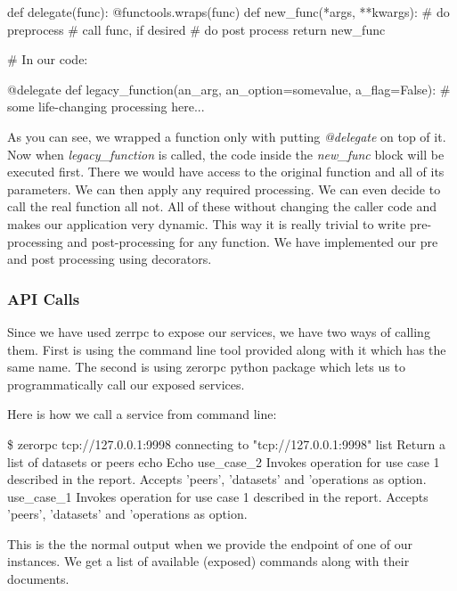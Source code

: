 \begin{python}
def delegate(func):
    @functools.wraps(func)
    def new_func(*args, **kwargs):
        # do preprocess
        # call func, if desired
        # do post process
    return new_func

# In our code:

@delegate
def legacy_function(an_arg, an_option=somevalue, a_flag=False):
    # some life-changing processing here...

\end{python}
As you can see, we wrapped a function only with putting \textit{@delegate} on top of it.
Now when \textit{legacy\_function} is called, the code inside the \textit{new\_func} block
will be executed first. 
There we would have access to the original function and all of its parameters. 
We can then apply any required processing. 
We can even decide to call the real function all not.
All of these without changing the caller code and makes our application very dynamic.
This way it is really trivial to write pre-processing and post-processing for any function.
We have implemented our pre and post processing using decorators.

\subsubsection{API Calls}
Since we have used zerrpc to expose our services, we have two ways of calling them.
First is using the command line tool provided along with it which has the same name.
The second is using zerorpc python package which lets us to programmatically call
our exposed services.

Here is how we call a service from command line:

\begin{python}
\$ zerorpc tcp://127.0.0.1:9998
connecting to "tcp://127.0.0.1:9998"
list             Return a list of datasets or peers
echo             Echo
use_case_2       Invokes operation for use case 1 described in the report. Accepts 'peers', 'datasets' and 'operations as option.
use_case_1       Invokes operation for use case 1 described in the report. Accepts 'peers', 'datasets' and 'operations as option.
\end{python}
This is the the normal output when we provide the endpoint of one of our instances. 
We get a list of available (exposed) commands along with their documents.


